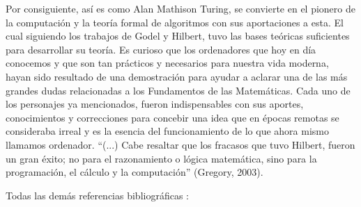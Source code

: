 \documentclass{article}
\begin{document}
Por consiguiente, así es como Alan Mathison Turing, se convierte en el pionero de la computación y la teoría formal de algoritmos con sus aportaciones a esta. El cual siguiendo los trabajos de Godel y Hilbert, tuvo las bases teóricas suficientes para desarrollar su teoría.
Es curioso que los ordenadores que hoy en día conocemos y que son tan prácticos y necesarios para nuestra vida moderna, hayan sido resultado de una demostración para ayudar a  aclarar una de las más grandes dudas  relacionadas a los Fundamentos de las Matemáticas.
Cada uno de los personajes ya mencionados, fueron indispensables con sus aportes, conocimientos y correcciones para concebir una idea que en épocas remotas se consideraba irreal y es la esencia del funcionamiento de lo que ahora mismo llamamos ordenador. “(...) Cabe resaltar que los fracasos que tuvo Hilbert, fueron un gran éxito; no para el razonamiento o lógica matemática, sino para la programación,  el cálculo y la computación” (Gregory, 2003). \cite{chaitin2003ordenadores}


Todas las demás referencias bibliográficas : \cite{coello2003breve} \cite{ferreiros2004episodio} \cite{mathinfalibles} \cite{incytde}









\end{document}
